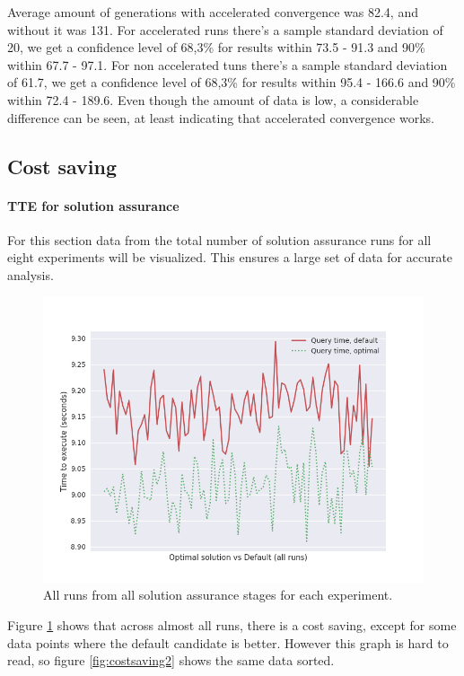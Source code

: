 \documentclass[a4paper,english]{report}
\begin{document}
	Average amount of generations with accelerated convergence was 82.4, and without it was 131. For accelerated runs there's a sample standard deviation of 20, we get a confidence level of 68,3\% for results within 73.5 - 91.3 and 90\% within 67.7 - 97.1. For non accelerated tuns there's a sample standard deviation of 61.7, we get a confidence level of 68,3\% for results within 95.4 - 166.6 and 90\% within 72.4 - 189.6. Even though the amount of data is low, a considerable difference can be seen, at least indicating that accelerated convergence works.
	\subsection{Cost saving}
	\paragraph{TTE for solution assurance} For this section data from the total number of solution assurance runs for all eight experiments will be visualized. This ensures a large set of data for accurate analysis.
	\begin{figure}[H]
		\centering
		\includegraphics[width=\textwidth]{costsaving}
		\caption{All runs from all solution assurance stages for each experiment.}
		\label{fig:costsaving}
	\end{figure}
	Figure \ref{fig:costsaving} shows that across almost all runs, there is a cost saving, except for some data points where the default candidate is better. However this graph is hard to read, so figure \ref{fig:costsaving2} shows the same data sorted.
\end{document}
